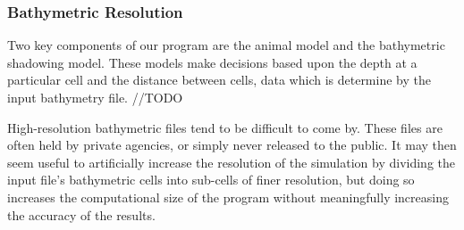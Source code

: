 \subsubsection{Bathymetric Resolution}
Two key components of our program are the animal model and the bathymetric shadowing model.  These models make decisions based upon the depth at a particular cell and the distance between cells, data which is determine by the input bathymetry file.  //TODO 

High-resolution bathymetric files tend to be difficult to come by.  These files are often held by private agencies, or simply never released to the public.  It may then seem useful to artificially increase the resolution of the simulation by dividing the input file's bathymetric cells into sub-cells of finer resolution, but doing so increases the computational size of the program without meaningfully increasing the accuracy of the results.    
 
